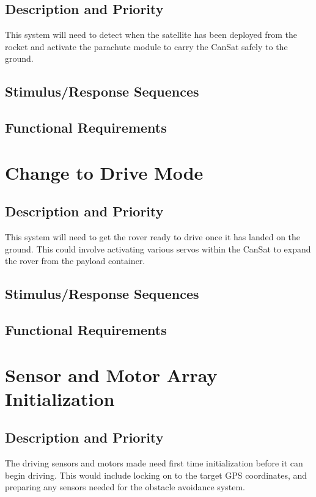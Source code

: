 \documentclass{scrreprt}
\begin{document}
\subsection{Description and Priority}
This system will need to detect when the satellite has been deployed from the rocket and activate the parachute module to carry the CanSat safely to the ground.


\subsection{Stimulus/Response Sequences}


\subsection{Functional Requirements}



\section{Change to Drive Mode}

\subsection{Description and Priority}
This system will need to get the rover ready to drive once it has landed on the ground. This could involve activating various servos within the CanSat to expand the rover from the payload container.


\subsection{Stimulus/Response Sequences}


\subsection{Functional Requirements}

\section{Sensor and Motor Array Initialization}

\subsection{Description and Priority}
	The driving sensors and motors made need first time initialization before it can begin driving. This would include locking on to the target GPS coordinates, and preparing any sensors needed for the obstacle avoidance system.
\end{document}
